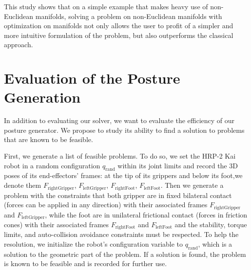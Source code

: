 This study shows that on a simple example that makes heavy use of non-Euclidean manifolds, solving a problem on non-Euclidean manifolds with optimization on manifolds not only allows the user to profit of a simpler and more intuitive formulation of the problem, but also outperforms the classical approach.


\section{Evaluation of the Posture Generation}
\label{sec:evaluation_of_the_posture_generation}

In addition to evaluating our solver, we want to evaluate the efficiency of our posture generator.
We propose to study its ability to find a solution to problems that are known to be feasible.

First, we generate a list of feasible problems.
To do so, we set the HRP-2 Kai robot in a random configuration $q_\text{rand}$ within its joint limits and record the 3D poses of its end-effectors' frames: at the tip of its grippers and below its foot,we denote them $F_\text{rightGripper}$, $F_\text{leftGripper}$, $F_\text{rightFoot}$, $F_\text{leftFoot}$.
Then we generate a problem with the constraints that both gripper are in fixed bilateral contact (forces can be applied in any direction) with their associated frames $F_\text{rightGripper}$ and $F_\text{leftGripper}$, while the foot are in unilateral frictional contact (forces in friction cones) with their associated frames $F_\text{rightFoot}$ and $F_\text{leftFoot}$ and the stability, torque limits, and auto-collision avoidance constraints must be respected.
To help the resolution, we initialize the robot's configuration variable to $q_\text{rand}$, which is a solution to the geometric part of the problem.
If a solution is found, the problem is known to be feasible and is recorded for further use.



